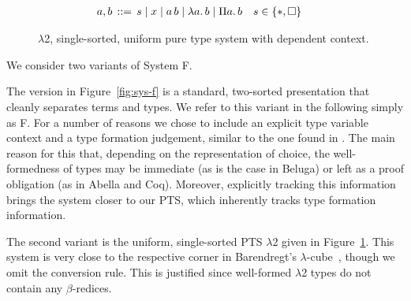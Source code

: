 \documentclass[a4paper,UKenglish]{lipics-v2016}
\makeatletter
\newcommand{\ms}{\,}
\newcommand{\mrel}[1]{\mathrel{\ms #1 \ms}}
\newcommand{\dom}[1]{\ensuremath{\textrm{dom($#1$)}}}
\newcommand{\OF}{\mrel{:}}
\newcommand{\bnfdef}{\mrel{::=}}
\newcommand{\set}[1]{\ensuremath{\{#1\}}}
\newcommand{\SysL}{$\lambda$2\xspace}
\newcommand{\of}{\ensuremath{\!:\!}}
\newcommand{\raisemath}[1]{\mathpalette{\raisem@th{#1}}}
\newcommand{\raisem@th}[3]{\raisebox{#1}{\ensuremath{#2#3}}}
\newcommand{\tsAnnot}[2]{\vdash\hspace{-.7em}^{\raisemath{1.5pt}{\scriptscriptstyle{#2}}}_{\raisemath{0.3pt}{\scriptscriptstyle{#1}}}} %
\newcommand{\tyL}{\tsAnnot{\lambda}{}} %
\newcommand{\typingL}[3]{\ensuremath{{#1} \mathrel{\tyL} #2 \OF #3}}
\newcommand{\Prp}{\ensuremath{\textrm{\textasteriskcentered}}}
\newcommand{\Typ}{\ensuremath{\square}}
\newcommand{\Lam}[1]{\ensuremath{\lambda #1.\,}}
\newcommand{\Prod}[1]{\ensuremath{\Pi #1.\,}}
\newcommand{\subst}[1]{\hphantom{|}\!\![{#1}]}
\makeatother
\begin{document}
\begin{figure}
  \begin{center}
    \begin{align*}
      a, b &\bnfdef s \mid x \mid a\,b \mid \Lam a b \mid \Prod a b & s &\in \set{\Prp, \Typ}
    \end{align*}
  \end{center}
  \caption{\SysL, single-sorted, uniform pure type system with dependent context.}
  \label{fig:sys-l}
\end{figure}

We consider two variants of System F.

The version in Figure~\ref{fig:sys-f} is a standard, two-sorted presentation that cleanly separates terms and types.
We refer to this variant in the following simply as F.
For a number of reasons we chose to include an explicit type variable context and a type formation judgement, similar to the one found in \cite{Harper2013}.
The main reason for this that, depending on the representation of choice, the well-formedness of types may be immediate (as is the case in Beluga) or left as a proof obligation (as in Abella and Coq).
Moreover, explicitly tracking this information brings the system closer to our PTS, which inherently tracks type formation information.

The second variant is the uniform, single-sorted PTS \SysL given in Figure~\ref{fig:sys-l}.
This system is very close to the respective corner in Barendregt's $\lambda$-cube~\cite{DBLP:journals/jfp/Barendregt91}, though we omit the conversion rule.
This is justified since well-formed \SysL types do not contain any $\beta$-redices.
\end{document}
